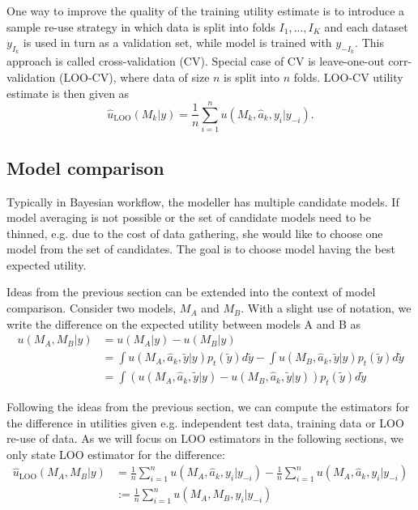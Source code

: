 \documentclass{article}
\begin{document}
One way to improve the quality of the training utility estimate is to introduce a sample re-use strategy in which data is split into folds $I_1, ..., I_K$ and each dataset $y_{I_k}$ is used in turn as a validation set, while model is trained with $y_{-I_k}$. This approach is called cross-validation (CV). Special case of CV is leave-one-out corr-validation (LOO-CV), where data of size $n$ is split into $n$ folds. LOO-CV utility estimate is then given as 
\begin{equation}
    \hat{u}_{\text{LOO}}(M_k | y) = \frac{1}{n} \sum_{i = 1}^n u(M_k, \hat{a}_k, y_i | y_{-i}) \label{eq:loo-utility}.
\end{equation}

\subsection{Model comparison}
Typically in Bayesian workflow, the modeller has multiple candidate models. If model averaging is not possible or the set of candidate models need to be thinned, e.g. due to the cost of data gathering, she would like to choose one model from the set of candidates. The goal is to choose model having the best expected utility.

Ideas from the previous section can be extended into the context of model comparison. Consider two models, $M_A$ and $M_B$. With a slight use of notation, we write the difference on the expected utility between models A and B as
\begin{align}
    u(M_A, M_B | y) &= u(M_A | y) - u(M_B | y) \nonumber \\ 
    &= \int u(M_A, \hat{a}_k, \tilde{y} | y) p_t(\tilde{y}) d\tilde{y} - \int u(M_B, \hat{a}_k, \tilde{y} | y) p_t(\tilde{y}) d\tilde{y} \nonumber \\
    &= \int \left( u(M_A, \hat{a}_k, \tilde{y} | y) - u(M_B, \hat{a}_k, \tilde{y} | y) \right) p_t(\tilde{y}) d\tilde{y}
\end{align}

Following the ideas from the previous section, we can compute the estimators for the difference in utilities given e.g. independent test data, training data or LOO re-use of data. As we will focus on LOO estimators in the following sections, we only state LOO estimator for the difference:
\begin{align}
    \hat{u}_{\text{LOO}}(M_A, M_B | y) &= \frac{1}{n} \sum_{i=1}^n u(M_A, \hat{a}_k, y_i | y_{-i}) - \frac{1}{n} \sum_{i=1}^n u(M_A, \hat{a}_k, y_i | y_{-i}) \nonumber \\
    &:= \frac{1}{n}\sum_{i=1}^n u(M_A, M_B, y_i | y_{-i})
\end{align}
\end{document}
